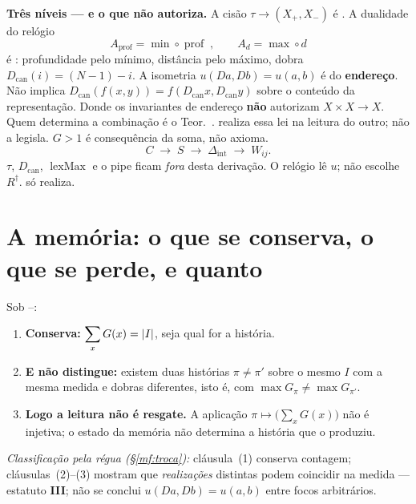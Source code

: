 \documentclass[../livro.tex]{subfiles}
\begin{document}
\medskip\noindent\textbf{Três níveis --- e o que  não autoriza.}
A cisão $\tau\to(X_{+},X_{-})$ é . A dualidade do relógio
\[
A_{\mathrm{prof}}=\min\circ\operatorname{prof}
\;,\qquad
A_d=\max\circ d
\]
é : profundidade pelo mínimo, distância pelo máximo,
dobra $D_{\mathrm{can}}(i)=(N-1)-i$. A isometria $u(Da,Db)=u(a,b)$ é do
\textbf{endereço}. Não implica
$D_{\mathrm{can}}(f(x,y))=f(D_{\mathrm{can}}x,D_{\mathrm{can}}y)$ sobre o
conteúdo da representação. Donde os invariantes de endereço \textbf{não}
autorizam $X\times X\to X$. Quem determina a combinação é o
Teor.~.  realiza essa lei na leitura do outro; não
a legisla. $G>1$ é consequência da soma, não axioma.
\[
\boxed{\;
C\;\longrightarrow\;S\;\longrightarrow\;\Delta_{\mathrm{int}}
\;\longrightarrow\;W_{ij}.
\;}
\]
$\tau$, $D_{\mathrm{can}}$, $\operatorname{lexMax}$ e o pipe ficam \emph{fora}
desta derivação. O relógio lê $u$; não escolhe $R^{\dagger}$.
 só realiza.

\section{A memória: o que se conserva, o que se perde, e quanto}\label{mf:memoria}

\begin{teorema}\label{mf:thm:reconstroi}
Sob --:
\begin{enumerate}\itemsep3pt
\item[(1)] \textbf{Conserva:} $\displaystyle\sum_{x}G(x)=\lvert I\rvert$, seja qual for
a história.
\item[(2)] \textbf{E não distingue:} existem duas histórias $\pi\neq\pi'$ sobre
o mesmo $I$ com a mesma medida e dobras diferentes, isto é, com
$\max G_\pi\neq\max G_{\pi'}$.
\item[(3)] \textbf{Logo a leitura não é resgate.} A aplicação
$\pi\mapsto\bigl(\sum_xG(x)\bigr)$ não é injetiva; o estado da memória não
determina a história que o produziu.
\end{enumerate}
\emph{Classificação pela régua (\S\ref{mf:troca}):} cláusula~(1) conserva contagem;
cláusulas~(2)--(3) mostram que \emph{realizações} distintas podem coincidir na
medida --- estatuto \textbf{III}; não se conclui $u(Da,Db)=u(a,b)$ entre focos
arbitrários.
\end{teorema}
\end{document}
